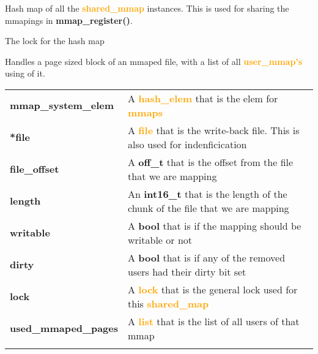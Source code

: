 \documentclass{report}
\newcommand{\fun}[1]{\textcolor{Emerald}{\textbf{#1}}}
\newcommand{\file}[1]{\textcolor{YellowGreen}{\textbf{#1}}}
\newcommand{\struct}[1]{\textcolor{orange}{\textbf{#1}}}
\newcommand{\var}[1]{\textcolor{RoyalPurple}{\textbf{#1}}}
\newcommand{\const}[1]{\textcolor{BrickRed}{\textbf{#1}}}
\newcommand{\pintoscode}[4]{}
\newcommand{\pintosfile}[3]{\pintoscode{#1}{#2}{\file{#3}}{#3}}
\begin{document}
				\pintosfile{37}{37}{mmap.c}
				Hash map of all the \struct{shared\_mmap} instances. This is used for 
				sharing the mmapings in \fun{mmap\_register()}.

				\pintosfile{40}{40}{mmap.c} 
				The lock for the hash map
				
				\pintosfile{45}{57}{mmap.c}
				Handles a page sized block of an mmaped file, with a list of all 
				\struct{user\_mmap's} using of it. \\
				\begin{center}
					\begin{tabular}{l p{10cm}}
							\vspace*{2mm}
							\var{mmap\_system\_elem}  & A \struct{hash\_elem} that is the elem for \struct{mmaps} \\ \vspace*{2mm}
							\var{*file}         			& A \struct{file} that is the write-back file. This is also used for indenficication \\ \vspace*{2mm}
							\var{file\_offset} 				& A \const{off\_t} that is the offset from the file that we are mapping \\ \vspace*{2mm}
							\var{length}          		& An \const{int16\_t} that is the length of the chunk of the file that we are mapping \\ \vspace*{2mm}
							\var{writable}            & A \const{bool} that is if the mapping should be writable or not \\ \vspace*{2mm}
							\var{dirty} 							& A \const{bool} that is if any of the removed users had their dirty bit set \\ \vspace*{2mm}
							\var{lock}          			& A \struct{lock} that is the general lock used for this \struct{shared\_map}\\ \vspace*{2mm}
							\var{used\_mmaped\_pages} & A \struct{list} that is the list of all users of that mmap \\ \vspace*{2mm}
					\end{tabular}
				\end{center}
				
\end{document}
